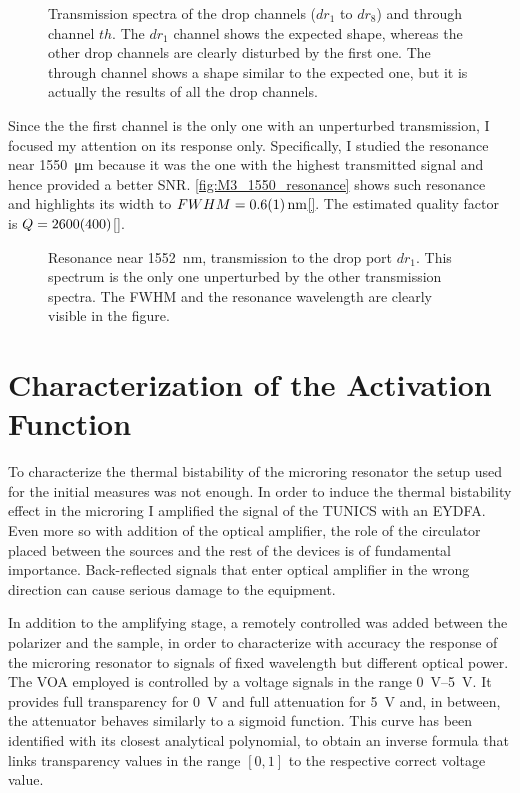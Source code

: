 \begin{figure}[htbp]
	\centering
%	
%	
	
	\caption{
		Transmission spectra of the drop channels ($dr_1$ to $dr_8$) and through channel $th$.
		The $dr_1$ channel shows the expected shape, whereas the other drop channels are clearly disturbed by the first one.
		The through channel shows a shape similar to the expected one, but it is actually the results of all the drop channels.
	}
	\label{fig:M3sweep}
\end{figure}

Since the the first channel is the only one with an unperturbed transmission, I focused my attention on its response only.
Specifically, I studied the resonance near \SI{1550}{\um} because it was the one with the highest transmitted signal and hence provided a better \acs{SNR}.
\autoref{fig:M3_1550_resonance} shows such resonance and highlights its width to $FWHM=\SI{0.6+-0.1}{\nm}$\ref{}.
The estimated quality factor is $Q=\num{2600+-400}$\ref{}.

\begin{figure}[htbp]
	\centering
	
	\caption{
		Resonance near \SI{1552}{\nm}, transmission to the drop port $dr_1$.
		This spectrum is the only one unperturbed by the other transmission spectra.
		The FWHM and the resonance wavelength are clearly visible in the figure.
	}
	\label{fig:M3_1550_resonance}
\end{figure}

\section{Characterization of the Activation Function}
\label{sec:Characterization_of_the_Activation_Function}
To characterize the thermal bistability of the microring resonator the setup used for the initial measures was not enough.
In order to induce the thermal bistability effect in the microring I amplified the signal of the TUNICS with an \ac{EYDFA}.
Even more so with addition of the optical amplifier, the role of the circulator placed between the sources and the rest of the devices is of fundamental importance.
Back-reflected signals that enter optical amplifier in the wrong direction can cause serious damage to the equipment.

In addition to the amplifying stage, a remotely controlled  was added between the polarizer and the sample, in order to characterize with accuracy the response of the microring resonator to signals of fixed wavelength but different optical power.
The \ac{VOA} employed is controlled by a voltage signals in the range \SIrange{0}{5}{\V}.
It provides full transparency for \SI{0}{\V} and full attenuation for \SI{5}{\V} and, in between, the attenuator behaves similarly to a sigmoid function.
This curve has been identified with its closest analytical polynomial, to obtain an inverse formula that links transparency values in the range $[0,1]$ to the respective correct voltage value.

